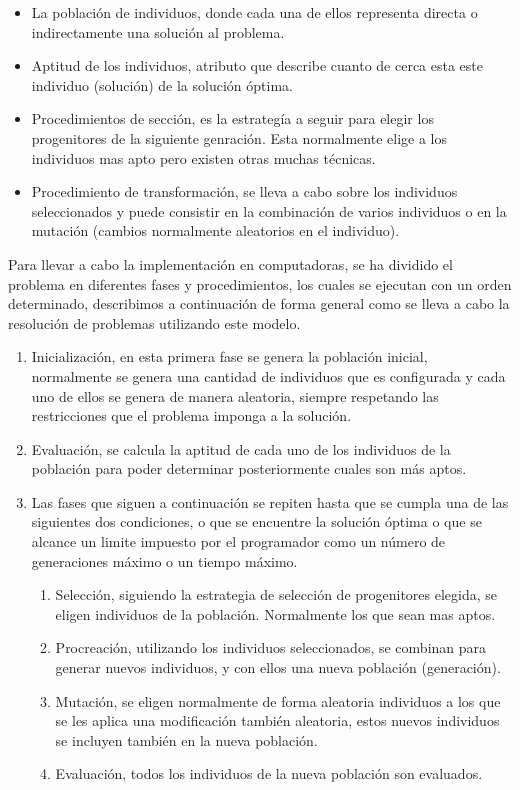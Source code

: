 \begin{itemize}
	\item La población de individuos, donde cada una de ellos representa directa o indirectamente una solución al problema.
	\item Aptitud de los individuos, atributo que describe cuanto de cerca esta este individuo (solución) de la solución \'optima. 
	\item Procedimientos de sección, es la estrateg\'ia a seguir para elegir los progenitores de la siguiente genraci\'on. Esta normalmente elige a los individuos mas apto pero existen otras muchas técnicas.
	\item Procedimiento de transformaci\'on, se lleva a cabo sobre los individuos seleccionados y puede consistir en la combinación de varios individuos o en la mutación (cambios normalmente aleatorios en el individuo).
\end{itemize}

Para llevar a cabo la implementación en computadoras, se ha dividido el problema en diferentes fases y procedimientos, los cuales se ejecutan con un orden determinado, describimos a continuación de forma general como se lleva a cabo la resolución de problemas utilizando este modelo.

\begin{enumerate}
	\item Inicializaci\'on, en esta primera fase se genera la población inicial, normalmente se genera una cantidad de individuos que es configurada y cada uno de ellos se genera de manera aleatoria, siempre respetando las restricciones que el problema imponga a la solución.
	\item Evaluaci\'on, se calcula la aptitud de cada uno de los individuos de la población para poder determinar posteriormente cuales son m\'as aptos.
	\item Las fases que siguen a continuación se repiten hasta que se cumpla una de las siguientes dos condiciones, o que se encuentre la solución \'optima o que se alcance un limite impuesto por el programador como un n\'umero de generaciones máximo o un tiempo máximo.
	\begin{enumerate}
		\item Selección, siguiendo la estrategia de selección de progenitores elegida, se eligen individuos de la población. Normalmente los que sean mas aptos.
		\item Procreaci\'on, utilizando los individuos seleccionados, se combinan para generar nuevos individuos, y con ellos una nueva población (generación).
		\item Mutaci\'on, se eligen normalmente de forma aleatoria individuos a los que se les aplica una modificación tambi\'en aleatoria, estos nuevos individuos se incluyen también en la nueva poblaci\'on.
		\item Evaluaci\'on, todos los individuos de la nueva poblaci\'on son evaluados.
	\end{enumerate}
\end{enumerate}

